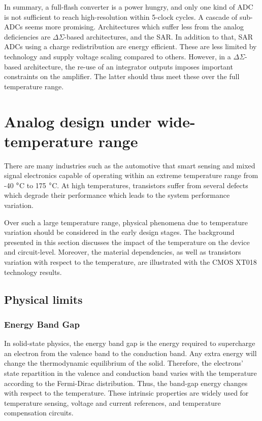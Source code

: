 In summary, a full-flash converter is a power hungry, and only one kind of ADC is not sufficient to reach high-resolution within 5-clock cycles. A cascade of sub-ADCs seems more promising. Architectures which suffer less from the analog deficiencies are $\Delta\Sigma$-based architectures, and the SAR\@. In addition to that, SAR ADCs using a charge redistribution are energy efficient. These are less limited by technology and supply voltage scaling compared to others.
However, in a $\Delta\Sigma$-based architecture, the re-use of an integrator outputs imposes important constraints on the amplifier. The latter should thus meet these over the full temperature range.

\clearpage
\section{Analog design under wide-temperature range}
\label{sec:temperature-analogue}

There are many industries such as the automotive that smart sensing and mixed signal electronics capable of operating within an extreme temperature range from -40 \(\degree \)C to 175 \(\degree \)C. At high temperatures, transistors suffer from several defects which degrade their performance which leads to the system performance variation.

Over such a large temperature range, physical phenomena due to temperature variation should be considered in the early design stages. The background presented in this section discusses the impact of the temperature on the device and circuit-level. Moreover, the material dependencies, as well as transistors variation with respect to the temperature, are illustrated with the CMOS XT018 technology results. %

\subsection{Physical limits}


\subsubsection{Energy Band Gap}        %
\label{sec:bandgap}
In solid-state physics, the energy band gap is the energy required to supercharge an electron from the valence band to the conduction band. Any extra energy will change the thermodynamic equilibrium of the solid. Therefore, the electrons' state repartition in the valence and conduction band varies with the temperature according to the Fermi-Dirac distribution. Thus, the band-gap energy changes with respect to the temperature. These intrinsic properties are widely used for temperature sensing, voltage and current references, and temperature compensation circuits.

